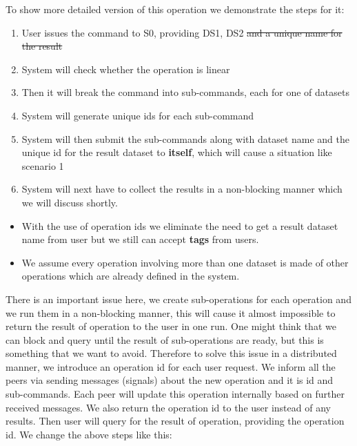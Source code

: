To show more detailed version of this operation we demonstrate the steps for it:

\begin{enumerate}
\item User issues the command to S0, providing DS1, DS2 \st{and a unique name for the result}
\item System will check whether the operation is linear
\item Then it will break the command into sub-commands, each for one of datasets
\item System will generate unique ids for each sub-command
\item System will then submit the sub-commands along with dataset name and the unique id for the result dataset
to \textbf{itself}, which will cause a situation like scenario 1
\item System will next have to collect the results in a non-blocking manner which we will discuss shortly.
\end{enumerate}

\begin{itemize}
\item With the use of operation ids we eliminate the need to get a 
result dataset name from user but we still can accept \textbf{tags} from users.
\end{itemize}

\begin{itemize}
\item We assume every operation involving more than one dataset is made of
other operations which are already defined in the system.
\end{itemize}

There is an important issue here, we create sub-operations for each operation and we run them in a non-blocking manner,
this will
cause it almost impossible to return the result of operation to the user in one run.
One might think that we can block and query until the result of sub-operations are ready,
but this is something that we want to avoid.
Therefore to solve this issue in a distributed manner, we introduce an operation id for each user request.
We inform all the peers via sending messages (signals) about the new operation and it is id and sub-commands. 
Each peer will update this operation internally based on further received messages.
We also return the operation id to the user instead of any results. 
Then user will query for the result of operation, providing the operation id. 
We change the above steps like this:

